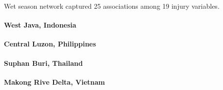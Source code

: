 Wet season network captured 25 associations among 19 injury variables. 

\paragraph{West Java, Indonesia}

\paragraph{Central Luzon, Philippines}

\paragraph{Suphan Buri, Thailand}

\paragraph{Makong Rive Delta, Vietnam}






